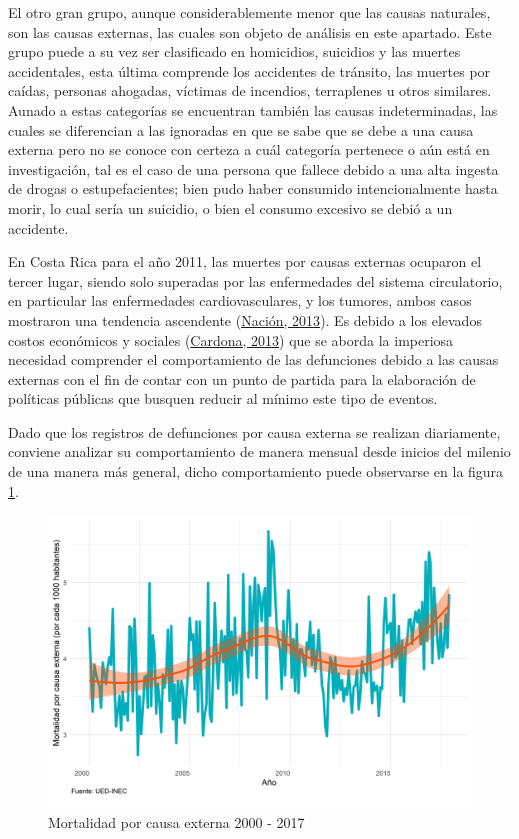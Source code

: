 \documentclass[
]{article}
\begin{document}
El otro gran grupo, aunque considerablemente menor que las causas
naturales, son las causas externas, las cuales son objeto de análisis en
este apartado. Este grupo puede a su vez ser clasificado en homicidios,
suicidios y las muertes accidentales, esta última comprende los
accidentes de tránsito, las muertes por caídas, personas ahogadas,
víctimas de incendios, terraplenes u otros similares. Aunado a estas
categorías se encuentran también las causas indeterminadas, las cuales
se diferencian a las ignoradas en que se sabe que se debe a una causa
externa pero no se conoce con certeza a cuál categoría pertenece o aún
está en investigación, tal es el caso de una persona que fallece debido
a una alta ingesta de drogas o estupefacientes; bien pudo haber
consumido intencionalmente hasta morir, lo cual sería un suicidio, o
bien el consumo excesivo se debió a un accidente.

En Costa Rica para el año 2011, las muertes por causas externas ocuparon
el tercer lugar, siendo solo superadas por las enfermedades del sistema
circulatorio, en particular las enfermedades cardiovasculares, y los
tumores, ambos casos mostraron una tendencia ascendente
(\protect\hyperlink{ref-nacion}{Nación, 2013}). Es debido a los elevados
costos económicos y sociales
(\protect\hyperlink{ref-ccpexternas}{Cardona, 2013}) que se aborda la
imperiosa necesidad comprender el comportamiento de las defunciones
debido a las causas externas con el fin de contar con un punto de
partida para la elaboración de políticas públicas que busquen reducir al
mínimo este tipo de eventos.

Dado que los registros de defunciones por causa externa se realizan
diariamente, conviene analizar su comportamiento de manera mensual desde
inicios del milenio de una manera más general, dicho comportamiento
puede observarse en la figura \ref{fig:externaplotgeneral}.

\begin{figure}[H]
\includegraphics[width=1\linewidth,height=1\textheight]{Tesis_files/figure-latex/externaplotgeneral-1} \caption{Mortalidad por causa externa 2000 - 2017}\label{fig:externaplotgeneral}
\end{figure}
\end{document}
